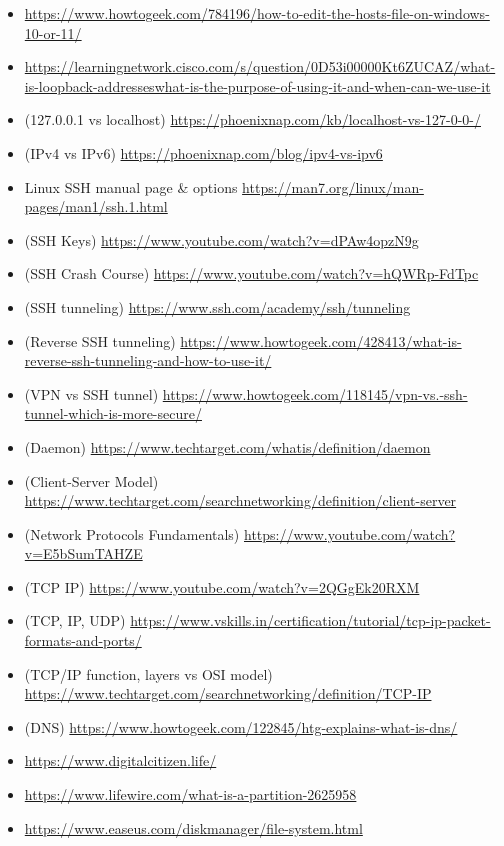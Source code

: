\documentclass[a4paper, 10pt]{article}
\begin{document}
\begin{itemize}
        \item \url{https://www.howtogeek.com/784196/how-to-edit-the-hosts-file-on-windows-10-or-11/}
        \item \url{https://learningnetwork.cisco.com/s/question/0D53i00000Kt6ZUCAZ/what-is-loopback-addresseswhat-is-the-purpose-of-using-it-and-when-can-we-use-it}
        \item (127.0.0.1 vs localhost) \url{https://phoenixnap.com/kb/localhost-vs-127-0-0-/}
        \item (IPv4 vs IPv6) \url{https://phoenixnap.com/blog/ipv4-vs-ipv6}
        \item Linux SSH manual page & options \url{https://man7.org/linux/man-pages/man1/ssh.1.html}
        \item (SSH Keys) \url{https://www.youtube.com/watch?v=dPAw4opzN9g}
        \item (SSH Crash Course) \url{https://www.youtube.com/watch?v=hQWRp-FdTpc}
        \item (SSH tunneling) \url{https://www.ssh.com/academy/ssh/tunneling}
        \item (Reverse SSH tunneling) \url{https://www.howtogeek.com/428413/what-is-reverse-ssh-tunneling-and-how-to-use-it/}
        \item (VPN vs SSH tunnel) \url{https://www.howtogeek.com/118145/vpn-vs.-ssh-tunnel-which-is-more-secure/}
        \item (Daemon) \url{https://www.techtarget.com/whatis/definition/daemon}
        \item (Client-Server Model) \url{https://www.techtarget.com/searchnetworking/definition/client-server}
        \item (Network Protocols Fundamentals) \url{https://www.youtube.com/watch?v=E5bSumTAHZE}
        \item (TCP IP) \url{https://www.youtube.com/watch?v=2QGgEk20RXM}
        \item (TCP, IP, UDP) \url{https://www.vskills.in/certification/tutorial/tcp-ip-packet-formats-and-ports/}
        \item (TCP/IP function, layers vs OSI model) \url{https://www.techtarget.com/searchnetworking/definition/TCP-IP}
        \item (DNS) \url{https://www.howtogeek.com/122845/htg-explains-what-is-dns/}
        \item \url{https://www.digitalcitizen.life/}
        \item \url{https://www.lifewire.com/what-is-a-partition-2625958}
        \item \url{https://www.easeus.com/diskmanager/file-system.html}

\end{itemize}
\end{document}

